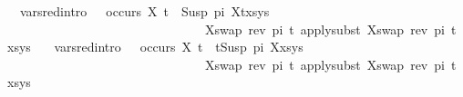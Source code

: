 \begin{isabellebody}
\ \ var{\isacharunderscore}{\kern0pt}{}{\isacharunderscore}{\kern0pt}sred{\isacharbrackleft}{\kern0pt}intro{\isacharbang}{\kern0pt}{\isacharbrackright}{\kern0pt}{\isacharcolon}{\kern0pt}\ \ \ {\isachardoublequoteopen}{\isasymnot}{\isacharparenleft}{\kern0pt}occurs\ X\ t{\isacharparenright}{\kern0pt}\ {\isasymLongrightarrow}\ {\isacharparenleft}{\kern0pt}{\isacharparenleft}{\kern0pt}Susp\ pi\ X{\isasymapprox}{\isacharquery}{\kern0pt}t{\isacharparenright}{\kern0pt}{\isacharhash}{\kern0pt}xs{\isacharcomma}{\kern0pt}ys{\isacharparenright}{\kern0pt}\ \isanewline
\ \ \ \ \ \ \ \ \ \ \ \ \ \ \ \ \ \ \ \ \ \ \ \ \ \ \ \ \ \ \ {\isasymturnstile}{\isacharbrackleft}{\kern0pt}{\isacharparenleft}{\kern0pt}X{\isacharcomma}{\kern0pt}swap\ {\isacharparenleft}{\kern0pt}rev\ pi{\isacharparenright}{\kern0pt}\ t{\isacharparenright}{\kern0pt}{\isacharbrackright}{\kern0pt}{\isasymleadsto}\ apply{\isacharunderscore}{\kern0pt}subst\ {\isacharbrackleft}{\kern0pt}{\isacharparenleft}{\kern0pt}X{\isacharcomma}{\kern0pt}swap\ {\isacharparenleft}{\kern0pt}rev\ pi{\isacharparenright}{\kern0pt}\ t{\isacharparenright}{\kern0pt}{\isacharbrackright}{\kern0pt}\ {\isacharparenleft}{\kern0pt}xs{\isacharcomma}{\kern0pt}ys{\isacharparenright}{\kern0pt}{\isachardoublequoteclose}\ {\isacharbar}{\kern0pt}\isanewline
\ \ var{\isacharunderscore}{\kern0pt}{}{\isacharunderscore}{\kern0pt}sred{\isacharbrackleft}{\kern0pt}intro{\isacharbang}{\kern0pt}{\isacharbrackright}{\kern0pt}{\isacharcolon}{\kern0pt}\ \ \ {\isachardoublequoteopen}{\isasymnot}{\isacharparenleft}{\kern0pt}occurs\ X\ t{\isacharparenright}{\kern0pt}\ {\isasymLongrightarrow}\ {\isacharparenleft}{\kern0pt}{\isacharparenleft}{\kern0pt}t{\isasymapprox}{\isacharquery}{\kern0pt}Susp\ pi\ X{\isacharparenright}{\kern0pt}{\isacharhash}{\kern0pt}xs{\isacharcomma}{\kern0pt}ys{\isacharparenright}{\kern0pt}\ \isanewline
\ \ \ \ \ \ \ \ \ \ \ \ \ \ \ \ \ \ \ \ \ \ \ \ \ \ \ \ \ \ \ {\isasymturnstile}{\isacharbrackleft}{\kern0pt}{\isacharparenleft}{\kern0pt}X{\isacharcomma}{\kern0pt}swap\ {\isacharparenleft}{\kern0pt}rev\ pi{\isacharparenright}{\kern0pt}\ t{\isacharparenright}{\kern0pt}{\isacharbrackright}{\kern0pt}{\isasymleadsto}\ apply{\isacharunderscore}{\kern0pt}subst\ {\isacharbrackleft}{\kern0pt}{\isacharparenleft}{\kern0pt}X{\isacharcomma}{\kern0pt}swap\ {\isacharparenleft}{\kern0pt}rev\ pi{\isacharparenright}{\kern0pt}\ t{\isacharparenright}{\kern0pt}{\isacharbrackright}{\kern0pt}\ {\isacharparenleft}{\kern0pt}xs{\isacharcomma}{\kern0pt}ys{\isacharparenright}{\kern0pt}{\isachardoublequoteclose}\isanewline
\isanewline

\end{isabellebody}
